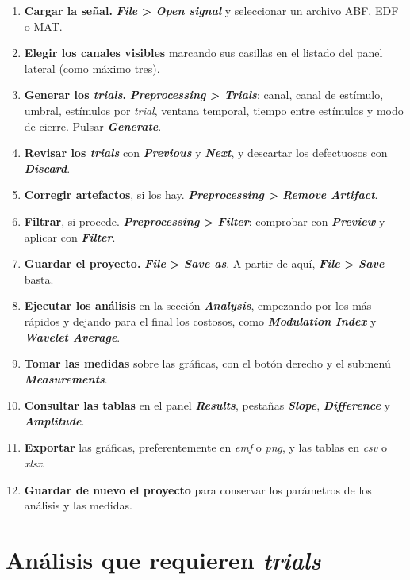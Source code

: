 \documentclass[11pt,a4paper]{article}
\begin{document}
\begin{enumerate}
    \item \textbf{Cargar la se\~nal.} \textbf{\textit{File} > \textit{Open signal}} y seleccionar un archivo ABF, EDF o MAT.
    \item \textbf{Elegir los canales visibles} marcando sus casillas en el listado del panel lateral (como m\'aximo tres).
    \item \textbf{Generar los \textit{trials}.} \textbf{\textit{Preprocessing} > \textit{Trials}}: canal, canal de est\'imulo, umbral, est\'imulos por \textit{trial}, ventana temporal, tiempo entre est\'imulos y modo de cierre. Pulsar \textbf{\textit{Generate}}.
    \item \textbf{Revisar los \textit{trials}} con \textbf{\textit{Previous}} y \textbf{\textit{Next}}, y descartar los defectuosos con \textbf{\textit{Discard}}.
    \item \textbf{Corregir artefactos}, si los hay. \textbf{\textit{Preprocessing} > \textit{Remove Artifact}}.
    \item \textbf{Filtrar}, si procede. \textbf{\textit{Preprocessing} > \textit{Filter}}: comprobar con \textbf{\textit{Preview}} y aplicar con \textbf{\textit{Filter}}.
    \item \textbf{Guardar el proyecto.} \textbf{\textit{File} > \textit{Save as}}. A partir de aqu\'i, \textbf{\textit{File} > \textit{Save}} basta.
    \item \textbf{Ejecutar los an\'alisis} en la secci\'on \textbf{\textit{Analysis}}, empezando por los m\'as r\'apidos y dejando para el final los costosos, como \textbf{\textit{Modulation Index}} y \textbf{\textit{Wavelet Average}}.
    \item \textbf{Tomar las medidas} sobre las gr\'aficas, con el bot\'on derecho y el submen\'u \textbf{\textit{Measurements}}.
    \item \textbf{Consultar las tablas} en el panel \textbf{\textit{Results}}, pesta\~nas \textbf{\textit{Slope}}, \textbf{\textit{Difference}} y \textbf{\textit{Amplitude}}.
    \item \textbf{Exportar} las gr\'aficas, preferentemente en \textit{emf} o \textit{png}, y las tablas en \textit{csv} o \textit{xlsx}.
    \item \textbf{Guardar de nuevo el proyecto} para conservar los par\'ametros de los an\'alisis y las medidas.
\end{enumerate}

\section{An\'alisis que requieren \textit{trials}}
\end{document}
